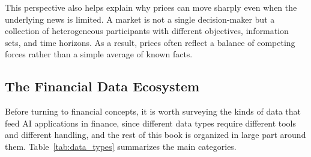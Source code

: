 \documentclass[../ai_in_finance]{subfiles}
\begin{document}
This perspective also helps explain why prices can move sharply even when the underlying news is limited. A market is not a single decision-maker but a collection of heterogeneous participants with different objectives, information sets, and time horizons. As a result, prices often reflect a balance of competing forces rather than a simple average of known facts.

\subsection{The Financial Data Ecosystem}

Before turning to financial concepts, it is worth surveying the kinds of data that feed AI applications in finance, since different data types require different tools and different handling, and the rest of this book is organized in large part around them. Table~\ref{tab:data_types} summarizes the main categories.
\end{document}
